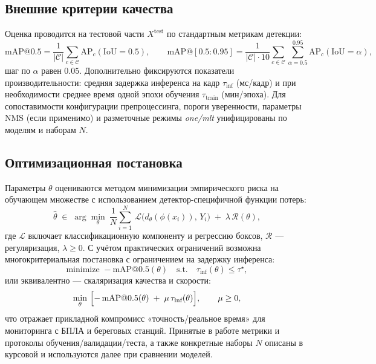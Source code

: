 \documentclass{article}
\begin{document}
\subsection{Внешние критерии качества}
Оценка проводится на тестовой части $X^{\mathrm{test}}$ по стандартным метрикам детекции:
\[
\mathrm{mAP@0.5}=\frac{1}{|\mathcal{C}|}\sum_{c\in\mathcal{C}}\mathrm{AP}_{c}(\mathrm{IoU}=0.5),\qquad
\mathrm{mAP@[0.5{:}0.95]}=\frac{1}{|\mathcal{C}|\cdot 10}\sum_{c\in\mathcal{C}}\sum_{\alpha=0.5}^{0.95}\mathrm{AP}_{c}(\mathrm{IoU}=\alpha),
\]
шаг по $\alpha$ равен $0.05$. Дополнительно фиксируются показатели производительности: средняя задержка инференса на кадр $\tau_{\text{inf}}$ (мс/кадр) и при необходимости среднее время одной эпохи обучения $\tau_{\text{train}}$ (мин/эпоха). Для сопоставимости конфигурации препроцессинга, пороги уверенности, параметры NMS (если применимо) и разметочные режимы \textit{one/mlt} унифицированы по моделям и наборам $N$.

\subsection{Оптимизационная постановка}
Параметры $\theta$ оцениваются методом минимизации эмпирического риска на обучающем множестве с использованием детектор-специфичной функции потерь:
\[
\hat\theta \;\in\; \arg\min_{\theta}\ \frac{1}{N}\sum_{i=1}^{N}\ \mathcal{L}\bigl(d_\theta(\phi(x_i)),\, Y_i\bigr)\;+\;\lambda\,\mathcal{R}(\theta),
\]
где $\mathcal{L}$ включает классификационную компоненту и регрессию боксов, $\mathcal{R}$ — регуляризация, $\lambda\ge 0$. С учётом практических ограничений возможна многокритериальная постановка с ограничением на задержку инференса:
\[
\text{minimize } -\mathrm{mAP}@0.5(\theta)\quad \text{s.t.}\quad \tau_{\text{inf}}(\theta)\le \tau^\star,
\]
или эквивалентно — скаляризация качества и скорости:
\[
\min_{\theta}\ \Bigl[-\,\mathrm{mAP}@0.5(\theta)\;+\;\mu\,\tau_{\text{inf}}(\theta)\Bigr], \qquad \mu\ge 0,
\]
что отражает прикладной компромисс «точность/реальное время» для мониторинга с БПЛА и береговых станций. Принятые в работе метрики и протоколы обучения/валидации/теста, а также конкретные наборы $N$ описаны в курсовой и используются далее при сравнении моделей.



\end{document}
